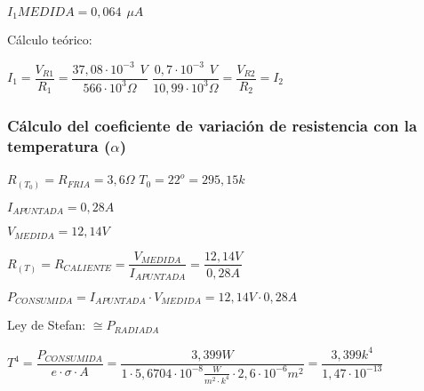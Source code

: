 \begin{enumerate}
	$ I_{1}MEDIDA = 0,064 \hspace{5pt} \mu A $
	
	Cálculo teórico:
	
	$ I_{1} = \dfrac{V_{R1}}{R_{1}} = \dfrac{37,08 \cdot 10^{-3}\hspace{5pt}V}{566 \cdot 10^{3}\Omega} $ \hspace{2pt} \fboxrule=1pt \fboxsep=6pt
	 \hspace{2pt} $ \dfrac{0,7 \cdot 10^{-3}\hspace{5pt}V}{10,99 \cdot 10^{3}\Omega} = \dfrac{V_{R2}}{R_{2}} = I_{2}  $
	
\end{enumerate}

\subsubsection{Cálculo del coeficiente de variación de resistencia con la temperatura ($ \alpha $)}

\begin{center}
	\fboxrule=1pt \fboxsep=6pt
\end{center}

$ R_{(T_{0})} = R_{FRIA} = 3,6 \Omega$ \hspace{10pt} $ T_{0} = 22^{o} = 295,15k $

$ I_{APUNTADA} = 0,28 A$

$ V_{MEDIDA} = 12,14 V$

$ R_{(T)} = R_{CALIENTE} = \dfrac{V_{MEDIDA}}{I_{APUNTADA}} = \dfrac{12,14 V}{0,28 A} $ \hspace{6pt} \fboxrule=1pt \fboxsep=6pt

$ P_{CONSUMIDA} = I_{APUNTADA} \cdot V_{MEDIDA} = 12,14 V \cdot 0,28 A $ \hspace{2pt} \fboxrule=1pt \fboxsep=6pt

Ley de Stefan: \fboxrule=1pt \fboxsep=6pt
 $ \cong P_{RADIADA} $
\vspace{6pt}

$ T^{4} = \dfrac{P_{CONSUMIDA}}{e \cdot \sigma \cdot A} = \dfrac{3,399W}{1 \cdot 5,6704 \cdot 10^{-8} \frac{W}{m^{2}\cdot k^{4}} \cdot 2,6 \cdot 10^{-6}m^{2}} = \dfrac{3,399k^{4}}{1,47\cdot 10^{-13}}$ \hspace{2pt} \fboxrule=1pt \fboxsep=6pt
\vspace{10pt}

